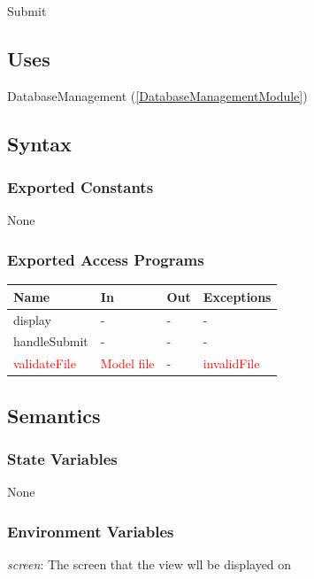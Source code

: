 \documentclass[12pt, titlepage]{article}
\begin{document}
Submit

\subsection{Uses}

DatabaseManagement (\ref{DatabaseManagementModule})

\subsection{Syntax}

\subsubsection{Exported Constants}

None

\subsubsection{Exported Access Programs}

\begin{center}
\begin{tabular}{p{2cm} p{4cm} p{4cm} p{2cm}}
\hline
\textbf{Name} & \textbf{In} & \textbf{Out} & \textbf{Exceptions} \\
\hline
display & - & - & - \\
handleSubmit & - & - & - \\
\textcolor{red}{validateFile} & \textcolor{red}{Model file} & - & \textcolor{red}{invalidFile} \\
\hline
\end{tabular}
\end{center}

\subsection{Semantics}

\subsubsection{State Variables}

None

\subsubsection{Environment Variables}

\textit{screen}: The screen that the view wll be displayed on
\end{document}
